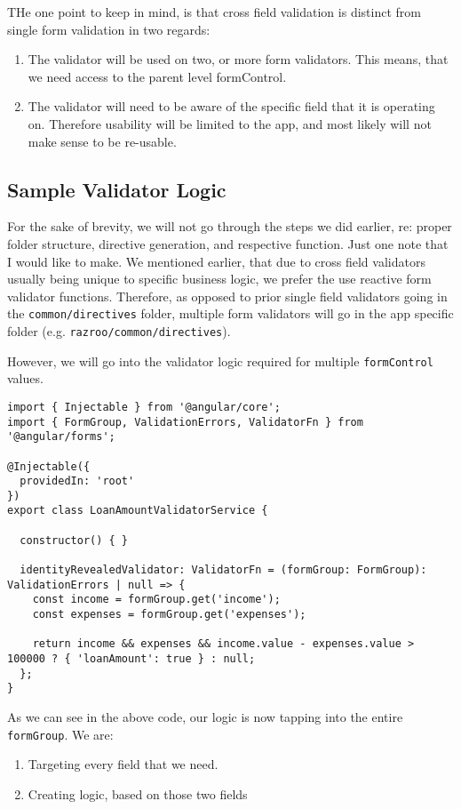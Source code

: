 THe one point to keep in mind, is that cross field validation is distinct 
from single form validation in two regards: 
\begin{enumerate}
  \item The validator will be used on two, or more form validators. This 
  means, that we need access to the parent level formControl.
  \item The validator will need to be aware of the specific field that it is
  operating on. Therefore usability will be limited to the app, and most likely
  will not make sense to be re-usable. 
\end{enumerate}


\subsection{Sample Validator Logic}
For the sake of brevity, we will not go through the steps we did earlier, re: 
proper folder structure, directive generation, and respective function. Just one 
note that I would like to make. We mentioned earlier, that due to cross field 
validators usually being unique to specific business logic, we prefer the use 
reactive form validator functions. Therefore, as opposed to prior single field 
validators going in the \lstinline{common/directives} folder, multiple form 
validators will go in the app specific folder (e.g. \lstinline{razroo/common/directives}).

However, we will go into the validator logic required for multiple \lstinline{formControl} 
values. 

\begin{lstlisting}[caption=loan-amount-validator.ts]
import { Injectable } from '@angular/core';
import { FormGroup, ValidationErrors, ValidatorFn } from '@angular/forms';

@Injectable({
  providedIn: 'root'
})
export class LoanAmountValidatorService {

  constructor() { }

  identityRevealedValidator: ValidatorFn = (formGroup: FormGroup): ValidationErrors | null => {
    const income = formGroup.get('income');
    const expenses = formGroup.get('expenses');

    return income && expenses && income.value - expenses.value > 100000 ? { 'loanAmount': true } : null;
  };
}  
\end{lstlisting}

As we can see in the above code, our logic is now tapping into the entire 
\lstinline{formGroup}. We are: 
\begin{enumerate}
  \item Targeting every field that we need.
  \item Creating logic, based on those two fields    
\end{enumerate}